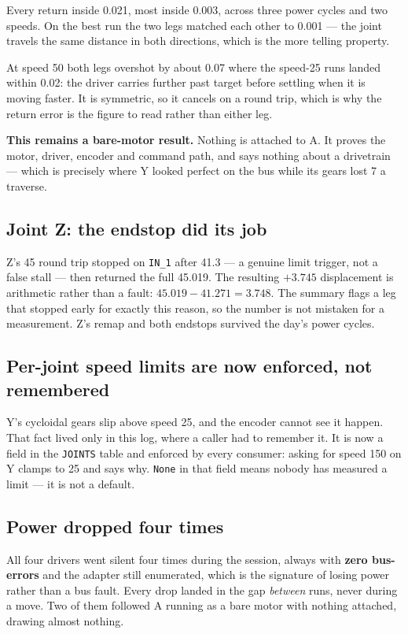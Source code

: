 \documentclass[11pt,letterpaper]{article}
\begin{document}
Every return inside 0.021\textdegree{}, most inside 0.003\textdegree{}, across
three power cycles and two speeds. On the best run the two legs matched each
other to 0.001\textdegree{} --- the joint travels the same distance in both
directions, which is the more telling property.

At speed 50 both legs overshot by about 0.07\textdegree{} where the speed-25 runs
landed within 0.02\textdegree{}: the driver carries further past target before
settling when it is moving faster. It is symmetric, so it cancels on a round
trip, which is why the return error is the figure to read rather than either leg.

\textbf{This remains a bare-motor result.} Nothing is attached to A. It proves
the motor, driver, encoder and command path, and says nothing about a
drivetrain --- which is precisely where Y looked perfect on the bus while its
gears lost 7\textdegree{} a traverse.

\subsection{Joint Z: the endstop did its job}
Z's 45\textdegree{} round trip stopped on \texttt{IN\_1} after
41.3\textdegree{} --- a genuine limit trigger, not a false stall --- then
returned the full 45.019\textdegree{}. The resulting $+3.745$\textdegree{}
displacement is arithmetic rather than a fault: $45.019 - 41.271 = 3.748$. The
summary flags a leg that stopped early for exactly this reason, so the number is
not mistaken for a measurement. Z's remap and both endstops survived the day's
power cycles.

\subsection{Per-joint speed limits are now enforced, not remembered}
Y's cycloidal gears slip above speed 25, and the encoder cannot see it happen.
That fact lived only in this log, where a caller had to remember it. It is now a
field in the \texttt{JOINTS} table and enforced by every consumer: asking for
speed 150 on Y clamps to 25 and says why. \texttt{None} in that field means
nobody has measured a limit --- it is not a default.

\subsection{Power dropped four times}
All four drivers went silent four times during the session, always with
\textbf{zero bus-errors} and the adapter still enumerated, which is the signature
of losing power rather than a bus fault. Every drop landed in the gap
\emph{between} runs, never during a move. Two of them followed A running as a
bare motor with nothing attached, drawing almost nothing.
\end{document}
